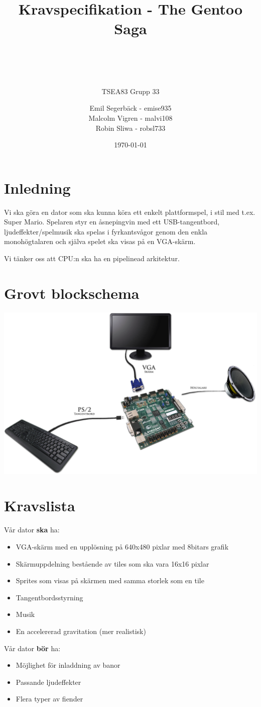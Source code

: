 \documentclass[a4paper,titlepage]{article}
\title{
\textbf{Kravspecifikation - The Gentoo Saga} \\
\subtitle{TSEA83 Grupp 33}
\author{
    Emil Segerbäck - emise935\\Malcolm Vigren - malvi108\\Robin Sliwa - robsl733
  }
  \\
\date{\today}
}
\begin{document}
	\maketitle
	\newpage

\section{Inledning}
Vi ska göra en dator som ska kunna köra ett enkelt plattformspel, 
i stil med t.ex. Super Mario. Spelaren styr en åsnepingvin med ett USB-tangentbord,
ljudeffekter/spelmusik ska spelas i fyrkantsvågor genom den enkla 
monohögtalaren och själva spelet ska visas på en VGA-skärm.

Vi tänker oss att CPU:n ska ha en pipelinead arkitektur.

\section{Grovt blockschema}
\includegraphics[width=14cm]{blockschema.png}

\section{Kravslista}
Vår dator \textbf{ska} ha:
\begin{itemize}
    \item VGA-skärm med en upplösning på 640x480 pixlar med 8bitars grafik
    \item Skärmuppdelning bestående av tiles som ska vara 16x16 pixlar
    \item Sprites som visas på skärmen med samma storlek som en tile
	\item Tangentbordsstyrning
    \item Musik
    \item En accelererad gravitation (mer realistisk)
\end{itemize}
Vår dator \textbf{bör} ha:
\begin{itemize}
	\item Möjlighet för inladdning av banor
	\item Passande ljudeffekter 
	\item Flera typer av fiender
\end{itemize}
\end{document}

